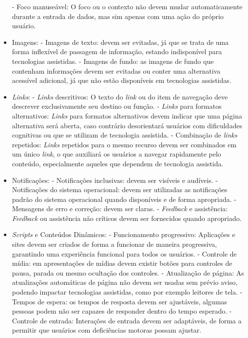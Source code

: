 \begin{itemize}
		\subitem - Foco manuseável: O foco ou o contexto não devem mudar automaticamente durante a entrada de dados, mas sim apenas com uma ação do próprio usuário.
	\item Imagens:
		\subitem - Imagens de texto: devem ser evitadas, já que se trata de uma forma inflexível de passagem de informação, estando indisponível para tecnologias assistidas.
		\subitem - Imagens de fundo: as imagens de fundo que contenham informações devem ser evitadas ou conter uma alternativa acessível adicional, já que não estão disponíveis em tecnologias assistidas.
	\item \textit{Links}:
		\subitem - \textit{Links} descritivos: O texto do \textit{link} ou do item de navegação deve descrever exclusivamente seu destino ou função.
		\subitem - \textit{Links} para formatos alternativos: \textit{Links} para formatos alternativos devem indicar
		que uma página alternativa será aberta, caso contrário desorientará usuários com dificuldades cognitivas ou que se utilizam de tecnologia assistida.
		\subitem - Combinação de \textit{links} repetidos: \textit{Links} repetidos para o mesmo recurso devem ser combinados em um único \textit{link}, o que auxiliará os usuários a navegar rapidamente pelo conteúdo, especialmente aqueles que dependem de tecnologia assistida.
	\item Notificações:
		\subitem - Notificações inclusivas: devem ser visíveis e audíveis.
		\subitem - Notificações do sistema operacional: devem ser utilizadas as notificações padrão do sistema operacional quando disponíveis e de forma apropriada.
		\subitem - Mensagens de erro e correção: devem ser claras.
		\subitem - \textit{Feedback} e assistência: \textit{Feedback} ou assistência não críticos devem ser fornecidos quando apropriado.
	\item \textit{Scripts} e Conteúdos Dinâmicos:
		\subitem - Funcionamento progressivo: Aplicações e sites devem ser criados de forma a funcionar de maneira progressiva, garantindo uma experiência funcional para todos os usuários.
		\subitem - Controle de mídia: em apresentações de mídias devem existir botões para controles de pausa, parada ou mesmo ocultação dos controles.
		\subitem - Atualização de página: As atualizações automáticas de página não devem ser usadas sem prévio aviso, podendo impactar tecnologias assistidas, como por exemplo leitores de tela.
		\subitem - Tempos de espera: os tempos de resposta devem ser ajustáveis, algumas pessoas podem não ser capazes de responder dentro do tempo esperado.
		\subitem - Controle de entrada: Interações de entrada devem ser adaptáveis, de forma a permitir que usuários com deficiências motoras possam ajustar.

\end{itemize}
